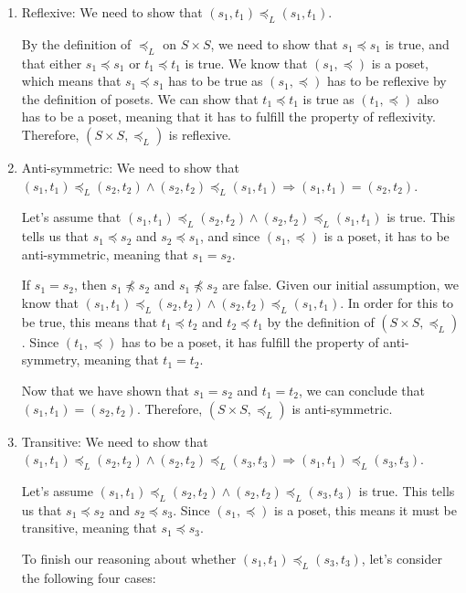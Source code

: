 \documentclass{article}
\begin{document}
\begin{enumerate}

\item Reflexive: We need to show that $(s_1, t_1) \preceq_{L} (s_1, t_1)$.

By the definition of $\preceq_{L}$ on $S \times S$, we need to show that $s_1 \preceq s_1$ is true, and that either $s_1 \preceq s_1$ or $t_1 \preceq t_1$ is true. We know that $(s_1, \preceq)$ is a poset, which means that $s_1 \preceq s_1$ has to be true as $(s_1, \preceq)$ has to be reflexive by the definition of posets. We can show that $t_1 \preceq t_1$ is true as $(t_1, \preceq)$ also has to be a poset, meaning that it has to fulfill the property of reflexivity. Therefore, $(S \times S, \preceq_{L})$ is reflexive.

\item Anti-symmetric: We need to show that $(s_1, t_1) \preceq_{L} (s_2, t_2) \land (s_2, t_2) \preceq_{L} (s_1, t_1) \Rightarrow (s_1, t_1) = (s_2, t_2)$.

Let's assume that $(s_1, t_1) \preceq_{L} (s_2, t_2) \land (s_2, t_2) \preceq_{L} (s_1, t_1)$ is true. This tells us that $s_1 \preceq s_2$ and $s_2 \preceq s_1$, and since $(s_1, \preceq)$ is a poset, it has to be anti-symmetric, meaning that $s_1 = s_2$. 

If $s_1 = s_2$, then $s_1 \npreceq s_2$ and $s_1 \npreceq s_2$ are false. Given our initial assumption, we know that $(s_1, t_1) \preceq_{L} (s_2, t_2) \land (s_2, t_2) \preceq_{L} (s_1, t_1)$. In order for this to be true, this means that $t_1 \preceq t_2$ and $t_2 \preceq t_1$ by the definition of $(S \times S, \preceq_{L})$. Since $(t_1, \preceq)$ has to be a poset, it has fulfill the property of anti-symmetry, meaning that $t_1 = t_2$. 

Now that we have shown that $s_1 = s_2$ and $t_1 = t_2$, we can conclude that $(s_1, t_1) = (s_2, t_2)$. Therefore, $(S \times S, \preceq_{L})$ is anti-symmetric.

\item Transitive: We need to show that $(s_1, t_1) \preceq_{L} (s_2, t_2) \land (s_2, t_2) \preceq_{L} (s_3, t_3) \Rightarrow (s_1, t_1) \preceq_{L} (s_3, t_3)$.

Let's assume $(s_1, t_1) \preceq_{L} (s_2, t_2) \land (s_2, t_2) \preceq_{L} (s_3, t_3)$ is true. This tells us that $s_1 \preceq s_2$ and $s_2 \preceq s_3$. Since $(s_1, \preceq)$ is a poset, this means it must be transitive, meaning that $s_1 \preceq s_3$. 

To finish our reasoning about whether $(s_1, t_1) \preceq_{L} (s_3, t_3)$, let's consider the following four cases:


\end{enumerate}
\end{document}
